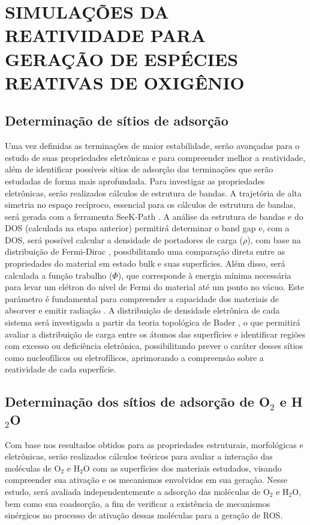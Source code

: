 \section{SIMULAÇÕES DA REATIVIDADE PARA GERAÇÃO DE ESPÉCIES REATIVAS DE 
OXIGÊNIO}

\subsection{Determinação de sítios de adsorção}
Uma vez definidas as terminações de maior estabilidade, serão avançadas para o estudo de suas propriedades eletrônicas e para compreender melhor a reatividade, além de identificar possíveis sítios de adsorção das terminações que serão estudadas de forma mais aprofundada. Para investigar as propriedades eletrônicas, serão realizados cálculos de estrutura de bandas. A trajetória de alta simetria no espaço recíproco, essencial para os cálculos de estrutura de bandas, será gerada com a ferramenta SeeK-Path \cite{hinuma2017band,togo2024spglib}. A análise da estrutura de bandas e do DOS (calculada na etapa anterior) permitirá determinar o band gap e, com a DOS, será possível calcular a densidade de portadores de carga ($\rho$), com base na distribuição de Fermi-Dirac \cite{haus2016fundamentals}, possibilitando uma comparação direta entre as propriedades do material em estado bulk e suas superfícies. Além disso, será calculada a função trabalho ($\Phi$), que corresponde à energia mínima necessária para levar um elétron do nível de Fermi do material até um ponto no vácuo. Este parâmetro é fundamental para compreender a capacidade dos materiais de absorver e emitir radiação \cite{dorini2025mapping}. A distribuição de densidade eletrônica de cada sistema será investigada a partir da teoria topológica de Bader \cite{bader1981quantum}, o que permitirá avaliar a distribuição de carga entre os átomos das superfícies e identificar regiões com excesso ou deficiência eletrônica, possibilitando prever o caráter desses sítios como nucleofílicos ou eletrofílicos, aprimorando a compreensão sobre a reatividade de cada superfície.

\subsection[Determinação dos sítios de adsorção de O2 e H2O]{Determinação dos sítios de adsorção de O$_2$ e H$_2$O}
Com base nos resultados obtidos para as propriedades estruturais, morfológicas e eletrônicas, serão realizados cálculos teóricos para avaliar a interação das moléculas de O$_2$ e H$_2$O com as superfícies dos materiais estudados, visando compreender sua ativação e os mecanismos envolvidos em sua geração. Nesse estudo, será avaliada independentemente a adsorção das moléculas de O$_2$ e H$_2$O, bem como sua coadsorção, a fim de verificar a existência de mecanismos sinérgicos no processo de ativação dessas moléculas para a geração de ROS.

